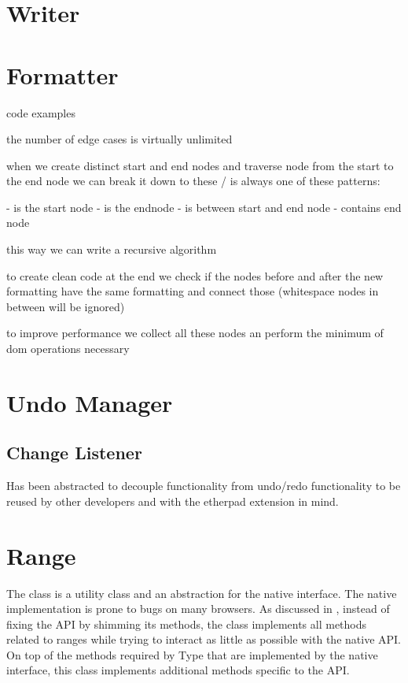 


\section{Writer}


\section{Formatter}

code examples

the number of edge cases is virtually unlimited

when we create distinct start and end nodes and traverse node from the start to the end node
we can break it down to these / is always one of these patterns: 

- is the start node
- is the endnode
- is between start and end node
- contains end node

this way we can write a recursive algorithm

to create clean code at the end we check if the nodes before and after the new formatting have the same formatting and connect those (whitespace nodes in between will be ignored)

to improve performance we collect all these nodes an perform the minimum of dom operations necessary

\section{Undo Manager}
\label{sec:undo_manager}
\subsection{Change Listener}
Has been abstracted to decouple functionality from undo/redo functionality to be reused by other developers and with the etherpad extension in mind.


\section{Range}

The  class is a utility class and an abstraction for the native  interface. The native implementation is prone to bugs on many browsers. As discussed in , instead of fixing the API by shimming its methods, the  class implements all methods related to ranges while trying to interact as little as possible with the native API. On top of the methods required by Type that are implemented by the native  interface, this class implements additional methods specific to the API.

